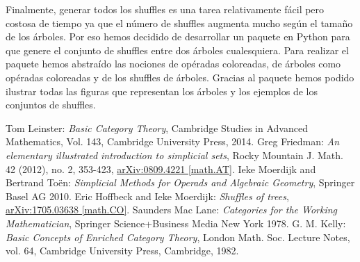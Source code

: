 \documentclass[11pt,a4paper,openright,oneside]{article}
\numberwithin{equation}{section}
\theoremstyle{definition}
\begin{document}
Finalmente, generar todos los shuffles es una tarea relativamente f\'acil pero costosa de tiempo ya que el n\'umero de shuffles augmenta mucho seg\'un el tama\~no de los \'arboles. Por eso hemos decidido de desarrollar un paquete en Python para que genere el conjunto de shuffles entre dos \'arboles cualesquiera.
Para realizar el paquete hemos abstra\'ido las nociones de op\'eradas coloreadas, de \'arboles como op\'eradas coloreadas y de los shuffles de \'arboles.
Gracias al paquete hemos podido ilustrar todas las figuras que representan los \'arboles y los ejemplos de los conjuntos de shuffles.







\newpage
\begin{thebibliography}{4}
     Tom Leinster: \textit{Basic Category Theory}, Cambridge Studies in Advanced Mathematics, Vol. 143, Cambridge University Press, 2014. 
     Greg Friedman: \textit{An elementary illustrated introduction to simplicial sets}, Rocky Mountain J. Math. 42 (2012), no. 2, 353-423, \href{https://arxiv.org/abs/0809.4221}{arXiv:0809.4221 [math.AT]}.
     Ieke Moerdijk and Bertrand To\"en: \textit{Simplicial Methods for Operads and Algebraic Geometry}, Springer Basel AG 2010.
     Eric Hoffbeck and Ieke Moerdijk: \textit{Shuffles of trees}, \href{https://arxiv.org/abs/1705.03638}{arXiv:1705.03638 [math.CO]}.
     Saunders Mac Lane: \textit{Categories for the Working Mathematician}, Springer Science+Business Media New York 1978.
     G. M. Kelly: \textit{Basic Concepts of Enriched Category Theory}, London Math. Soc. Lecture Notes, vol. 64, Cambridge University Press, Cambridge, 1982.
\end{thebibliography}
\end{document}
